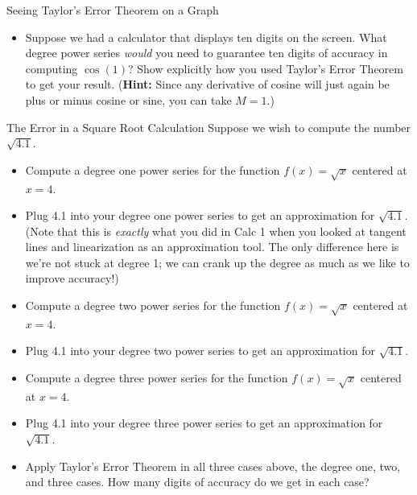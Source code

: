 \begin{exercise}{Seeing Taylor's Error Theorem on a Graph \Coffeecup \Coffeecup}
\begin{itemize}
\vspace*{2in}

\item Suppose we had a calculator that displays ten digits on the screen.  What degree power series \emph{would} you need to guarantee ten digits of accuracy in computing $\cos(1)$?  Show explicitly how you used Taylor's Error Theorem to get your result. ({\bf Hint:} Since any derivative of cosine will just again be plus or minus cosine or sine, you can take $M=1$.)

\vspace*{2in}

\end{itemize}
\end{exercise}

\begin{exercise}{The Error in a Square Root Calculation \Coffeecup \Coffeecup \Coffeecup}
Suppose we wish to compute the number $\sqrt{4.1}$. 
\begin{itemize}
\item Compute a degree one power series for the function $f(x)=\sqrt{x}$ centered at $x=4$.
\vspace*{1in}
\item Plug 4.1 into your degree one power series to get an approximation for $\sqrt{4.1}$. (Note that this is \emph{exactly} what you did in Calc 1 when you looked at tangent lines and linearization as an approximation tool.  The only difference here is we're not stuck at degree 1; we can crank up the degree as much as we like to improve accuracy!)
\vspace*{1in}
\item Compute a degree two power series for the function $f(x)=\sqrt{x}$ centered at $x=4$.
\vspace*{1in}
\item Plug 4.1 into your degree two power series to get an approximation for $\sqrt{4.1}$. 
\vspace*{1in}
\item Compute a degree three power series for the function $f(x)=\sqrt{x}$ centered at $x=4$.
\vspace*{1in}
\item Plug 4.1 into your degree three power series to get an approximation for $\sqrt{4.1}$. 
\vspace*{1in}
\item Apply Taylor's Error Theorem in all three cases above, the degree one, two, and three cases.  How many digits of accuracy do we get in each case?

\end{itemize}
\end{exercise}

